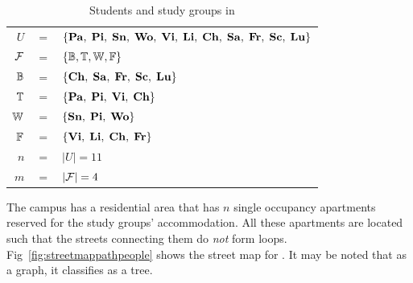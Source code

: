 \documentclass[MS]             %
              {iitmdiss_as}    %
\begin{document}
\begin{table}[t]%
  \centering
  { \footnotesize
  \begin{tabular}{rcl}
    $U $&$=$&$ \{{\bf Pa},\; {\bf Pi},\; {\bf Sn},\; {\bf Wo},\; {\bf Vi},\; {\bf Li},\; {\bf Ch},\;
    {\bf Sa},\; {\bf Fr},\; {\bf Sc},\; {\bf Lu}\}$\\
    ${\cal F} $&$=$&$ \{\mathbb{B}, \mathbb{T}, \mathbb{W}, \mathbb{F}\}$\\
    $\mathbb{B} $&$=$&$ \{{\bf Ch},\;  {\bf Sa},\;  {\bf Fr},\;  {\bf Sc},\;  {\bf Lu} \}$\\
    $\mathbb{T} $&$=$&$ \{{\bf Pa},\;  {\bf Pi},\;  {\bf Vi},\;  {\bf Ch} \}$\\
    $\mathbb{W} $&$=$&$ \{{\bf Sn},\;  {\bf Pi},\;  {\bf Wo} \}$\\
    $\mathbb{F} $&$=$&$ \{{\bf Vi},\;  {\bf Li},\;  {\bf Ch},\;  {\bf Fr} \}$\\
    $n $&$=$&$ |U| = 11$\\
    $m $&$=$&$ |{\cal F}| = 4$      
  \end{tabular}
}
  \caption{\figtabsize Students and study groups in \WSI}
  \label{tab:wsigroups}
\end{table}

The campus has a residential area {\residenceblock} that has $n$
single occupancy apartments reserved for the study groups'
accommodation.  All these apartments are located such that the streets
connecting them do {\em not} form
loops. Fig~\ref{fig:streetmappathpeople} 
shows the street map for {\residenceblock}. It may be noted that as a
graph, it classifies as a tree.
\end{document}
